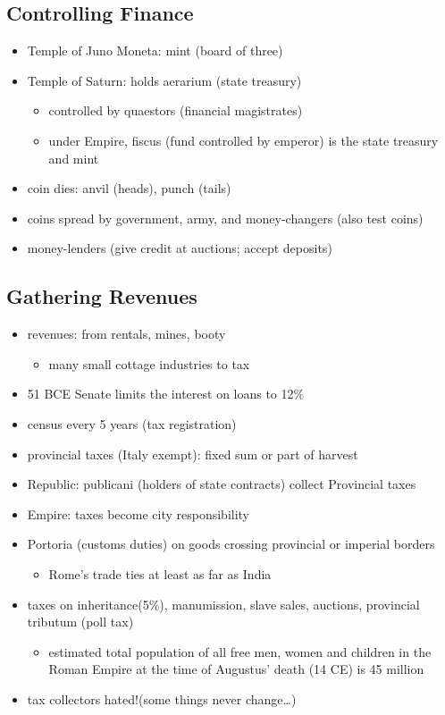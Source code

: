 \documentclass[12pt, twoside]{article}
\begin{document}
\subsection{Controlling Finance}
\begin{itemize}
\item Temple of Juno Moneta: mint (board of three)
\item Temple of Saturn: holds aerarium (state treasury)
	\begin{itemize}
	\item controlled by quaestors (financial magistrates)
	\item under Empire, fiscus (fund controlled by emperor) is the state treasury and mint
	\end{itemize}
\item coin dies: anvil (heads), punch (tails)
\item coins spread by government, army, and money-changers (also test coins)
\item money-lenders (give credit at auctions; accept deposits)
\end{itemize}

\subsection{Gathering Revenues}
\begin{itemize}
\item revenues: from rentals, mines, booty
	\begin{itemize}
	\item many small cottage industries to tax
	\end{itemize}
\item 51 BCE Senate limits the interest on loans to 12\%
\item census every 5 years (tax registration)
\item provincial taxes (Italy exempt): fixed sum or part of harvest
\item Republic: publicani (holders of state contracts) collect Provincial taxes
\item Empire: taxes become city responsibility 
\item Portoria  (customs duties) on goods crossing provincial or imperial borders
	\begin{itemize}
	\item Rome’s trade ties at least as far as India 
	\end{itemize}
\item taxes on inheritance(5\%), manumission, slave sales, auctions, provincial tributum (poll tax)
	\begin{itemize}
	\item estimated total population of all free men, women and children in the Roman Empire at the time of Augustus’ death (14 CE) is 45 million 
	\end{itemize}
\item tax collectors hated!(some things never change…)
\end{itemize}
\end{document}
